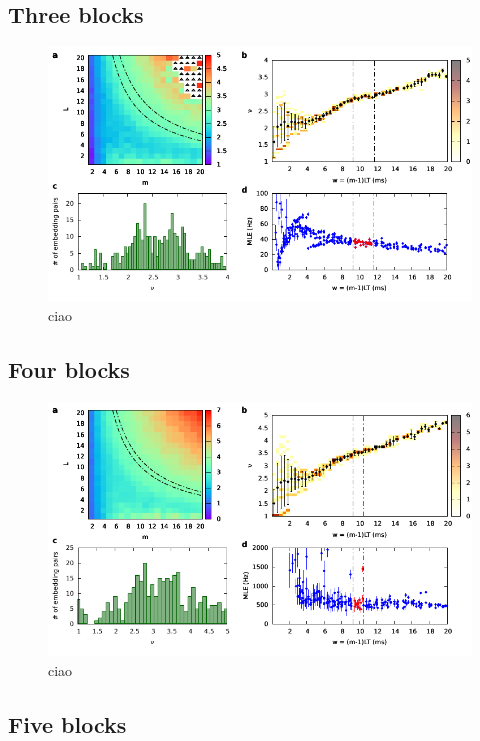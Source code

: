 \documentclass[a4paper,11pt,aps,secnumarabic,balancelastpage,amsmath,amssymb,floatfix,table]{article}
\begin{document}
\subsection{Three blocks}

\begin{figure}[H]
    \centering
    \includegraphics[width=\linewidth]{../3_blocks/1e5_points/plots/chaos.pdf}
    \caption{ciao}
    \label{fig:3 blocks chaos}
\end{figure}

\subsection{Four blocks}

\begin{figure}[H]
    \centering
    \includegraphics[width=\linewidth]{../4_blocks/1e5_points/plots/chaos.pdf}
    \caption{ciao}
    \label{fig:4 blocks chaos}
\end{figure}


\subsection{Five blocks}
\end{document}
